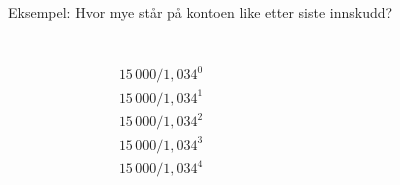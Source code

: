\begin{frame}[t]{Eksempel: Hvor mye står på kontoen like etter siste innskudd?}
\begin{center}
\end{center}
\begin{columns}[T,onlytextwidth]
  \begin{column}{0.10\textwidth}
    \begin{align*}
      &\\
      &\\
      &15\,000 / 1,034^0\\
      &15\,000 / 1,034^1\\
      &15\,000 / 1,034^2\\
      &15\,000 / 1,034^3\\
      &15\,000 / 1,034^4
    \end{align*}
  \end{column}
   \begin{column}{0.90\textwidth}
\end{column}
\end{columns}
\end{frame}

